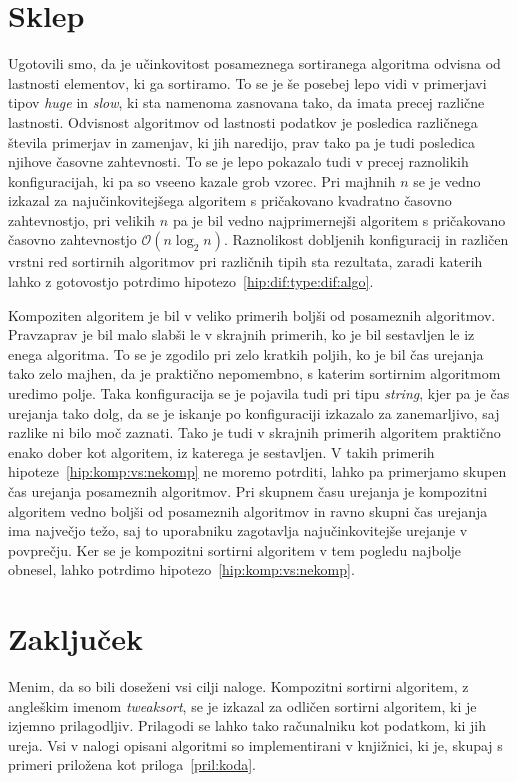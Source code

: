 \documentclass[a4paper,oneside,12pt]{article}
\begin{document}
\pagebreak
\section{Sklep}
Ugotovili smo, da je učinkovitost posameznega sortiranega algoritma odvisna od
lastnosti elementov, ki ga sortiramo. To se je še posebej lepo vidi v primerjavi
tipov \emph{huge} in \emph{slow}, ki sta namenoma zasnovana tako, da imata
precej različne lastnosti. Odvisnost algoritmov od lastnosti podatkov je posledica
različnega števila primerjav in zamenjav, ki jih naredijo, prav tako pa je tudi
posledica njihove časovne zahtevnosti. To se je lepo pokazalo tudi v precej
raznolikih konfiguracijah, ki pa so vseeno kazale grob vzorec. Pri majhnih $n$ se je
vedno izkazal za najučinkovitejšega algoritem s pričakovano kvadratno časovno
zahtevnostjo, pri velikih $n$ pa je bil vedno   
najprimernejši algoritem s pričakovano časovno zahtevnostjo $\mathcal{O}(n\log_2
n)$. Raznolikost dobljenih konfiguracij in različen vrstni red sortirnih
algoritmov pri različnih tipih sta rezultata, zaradi katerih lahko z gotovostjo
potrdimo hipotezo~\ref{hip:dif:type:dif:algo}.

Kompoziten algoritem je bil v veliko primerih boljši od posameznih
algoritmov. Pravzaprav je bil malo slabši le v skrajnih primerih, ko je bil
sestavljen le iz enega algoritma. To se je zgodilo pri zelo kratkih poljih, ko
je bil čas urejanja tako zelo majhen, da je praktično nepomembno, s katerim
sortirnim algoritmom uredimo polje. Taka konfiguracija se je pojavila tudi pri
tipu \emph{string}, kjer pa je čas urejanja tako dolg, da se je iskanje po
konfiguraciji izkazalo za zanemarljivo, saj razlike ni bilo moč
zaznati. Tako je tudi v skrajnih primerih
algoritem praktično enako dober kot algoritem, iz katerega je sestavljen.
V takih primerih hipoteze~\ref{hip:komp:vs:nekomp} ne moremo potrditi, 
lahko pa primerjamo skupen čas urejanja posameznih algoritmov.
Pri skupnem času urejanja je kompozitni algoritem vedno boljši od
posameznih algoritmov in ravno skupni čas urejanja ima največjo težo, saj to
uporabniku zagotavlja najučinkovitejše urejanje v povprečju. 
Ker se je kompozitni sortirni algoritem
v tem pogledu najbolje obnesel, lahko potrdimo hipotezo~\ref{hip:komp:vs:nekomp}.
\pagebreak

\section{Zaključek}
Menim, da so bili doseženi vsi cilji naloge. Kompozitni sortirni algoritem, z
angleškim imenom \emph{tweaksort}, se je izkazal za odličen sortirni algoritem,
ki je izjemno prilagodljiv. Prilagodi se lahko tako računalniku kot podatkom, ki
jih ureja. Vsi v nalogi opisani algoritmi so implementirani v
knjižnici, ki je, skupaj s primeri priložena kot priloga~\ref{pril:koda}. 
\end{document}
